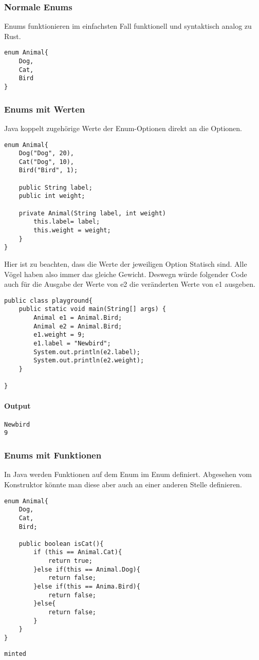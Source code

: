 \documentclass[a4paper, 1ppt]{article}
\begin{document}
\subsubsection{Normale Enums}
Enums funktionieren im einfachsten Fall funktionell und syntaktisch analog zu Rust.
\begin{verbatim}
enum Animal{
    Dog,
    Cat,
    Bird
}
\end{verbatim}
\newpage
\subsubsection{Enums mit Werten}
Java koppelt zugehörige Werte der Enum-Optionen direkt an die Optionen.
\begin{verbatim}
enum Animal{
    Dog("Dog", 20),
    Cat("Dog", 10),
    Bird("Bird", 1);

    public String label;
    public int weight;

    private Animal(String label, int weight)
        this.label= label;
        this.weight = weight;
    }
}
\end{verbatim}
Hier ist zu beachten, dass die Werte der jeweiligen Option Statisch sind.
Alle Vögel haben also immer das gleiche Gewicht.
Deswegn würde folgender Code auch für die Ausgabe der Werte von e2 die veränderten Werte von e1 ausgeben.
\begin{verbatim}
public class playground{
	public static void main(String[] args) {
		Animal e1 = Animal.Bird;
		Animal e2 = Animal.Bird;
		e1.weight = 9;		
		e1.label = "Newbird";
		System.out.println(e2.label);
		System.out.println(e2.weight);
	}
	
}
\end{verbatim}
\paragraph{Output}
\begin{verbatim}
Newbird
9
\end{verbatim}
\newpage
\subsubsection{Enums mit Funktionen}
In Java werden Funktionen auf dem Enum im Enum definiert. Abgesehen vom Konstruktor könnte man diese aber auch an einer anderen Stelle definieren.
\begin{verbatim}
enum Animal{
    Dog,
    Cat,
    Bird;

    public boolean isCat(){
        if (this == Animal.Cat){
            return true;
        }else if(this == Animal.Dog){
            return false;
        }else if(this == Anima.Bird){
            return false;
		}else{
            return false;
		}
    }
}
\end{verbatim}
\begin{verbatim}
minted\end{verbatim}
\end{document}
